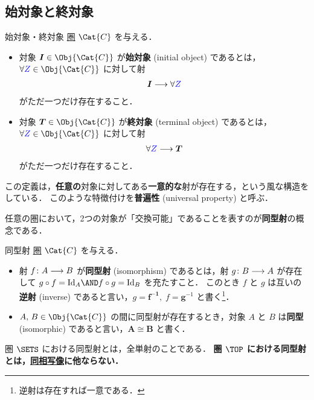 \documentclass[geometry_main]{subfiles}
\begin{document}
\subsection{始対象と終対象}

\begin{mydef}[label=def:initial-terminal]{始対象・終対象}
	\hyperref[def:category]{圏} $\Cat{C}$ を与える．
	\begin{itemize}
		\item 対象 $\bm{I} \in \Obj{\Cat{C}}$ が\textbf{始対象} (initial object) であるとは，
		$\forall \textcolor{blue}{Z} \in \Obj{\Cat{C}}$ に対して射
		\begin{align}
			\bm{I} \longrightarrow \forall \textcolor{blue}{Z}
		\end{align}
		がただ一つだけ存在すること．
		\item 対象 $\bm{T} \in \Obj{\Cat{C}}$ が\textbf{終対象} (terminal object) であるとは，
		$\forall \textcolor{blue}{Z} \in \Obj{\Cat{C}}$ に対して射
		\begin{align}
			\forall\textcolor{blue}{Z} \longrightarrow \bm{T}
		\end{align}
		がただ一つだけ存在すること．
	\end{itemize}
\end{mydef}
この定義は，\textbf{任意の}対象に対してある\textbf{一意的な}射が存在する，という風な構造をしている．
このような特徴付けを\textbf{普遍性} (universal property) と呼ぶ．

任意の圏において，2つの対象が「交換可能」であることを表すのが\textbf{同型射}の概念である．
\begin{mydef}[label=def:iso]{同型射}
	\hyperref[def:category]{圏} $\Cat{C}$ を与える．
	\begin{itemize}
		\item 射 $f \colon A \longrightarrow B$ が\textbf{同型射} (isomorphism) であるとは，射 $g \colon B \longrightarrow A$ が存在して
		$ g \circ f = \mathrm{Id}_A \AND f \circ g = \mathrm{Id}_B$ を充たすこと．
		このとき $f$ と $g$ は互いの\textbf{逆射} (inverse) であると言い，$g = \bm{f^{-1}},\; f = \bm{g}^{-1}$ と書く\footnote{逆射は存在すれば一意である．}．
		\item $A,\, B \in \Obj{\Cat{C}}$ の間に同型射が存在するとき，対象 $A$ と $B$ は\textbf{同型} (isomorphic) であると言い，$\bm{A\cong B}$ と書く．
	\end{itemize}
\end{mydef}

圏 $\SETS$ における同型射とは，全単射のことである．
\textbf{圏 $\TOP$ における同型射とは，\hyperref[def.homeo]{同相写像}に他ならない．}
\end{document}
